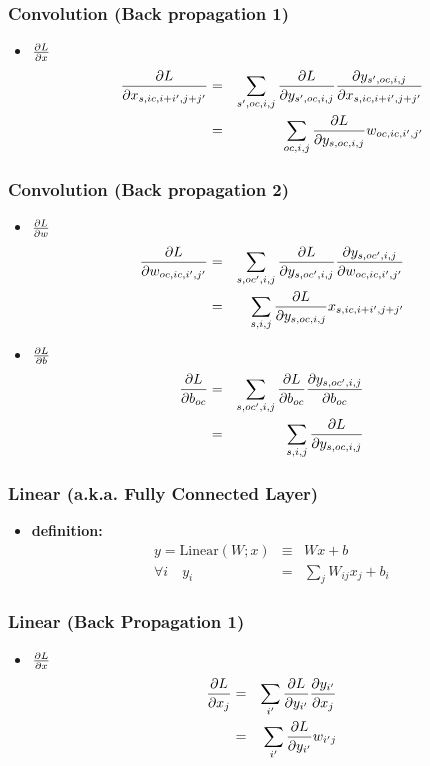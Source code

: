 \documentclass[12pt,dvipdfmx]{beamer}
\newcommand{\ao}[1]{{\color{blue}#1}}
\begin{document}
\begin{frame}
  \frametitle{Convolution (Back propagation 1)}
  \begin{itemize}
  \item $\frac{\partial L}{\partial x}$
    \begin{eqnarray*}
      \frac{\partial L}{\partial x_{s,ic,i+i',j+j'}}
      & = & \sum_{s',oc,i,j} \frac{\partial L}{\partial y_{s',oc,i,j}} \frac{\partial y_{s',oc,i,j}}{\partial x_{s,ic,i+i',j+j'}} \\
      & = & \sum_{oc,i,j} \frac{\partial L}{\partial y_{s,oc,i,j}} w_{oc,ic,i',j'} 
    \end{eqnarray*}
  \end{itemize}
\end{frame}

\begin{frame}
  \frametitle{Convolution (Back propagation 2)}
  \begin{itemize}
  \item $\frac{\partial L}{\partial w}$
    \begin{eqnarray*}
      \frac{\partial L}{\partial w_{oc,ic,i',j'}}
      & = & \sum_{s,oc',i,j} \frac{\partial L}{\partial y_{s,oc',i,j}} \frac{\partial y_{s,oc',i,j}}{\partial w_{oc,ic,i',j'}} \\
      & = & \sum_{s,i,j} \frac{\partial L}{\partial y_{s,oc,i,j}} x_{s,ic,i+i',j+j'}
    \end{eqnarray*}

  \item $\frac{\partial L}{\partial b}$
    \begin{eqnarray*}
      \frac{\partial L}{\partial b_{oc}}
      & = & \sum_{s,oc',i,j} \frac{\partial L}{\partial b_{oc}} \frac{\partial y_{s,oc',i,j}}{\partial b_{oc}} \\
      & = & \sum_{s,i,j} \frac{\partial L}{\partial y_{s,oc,i,j}}
    \end{eqnarray*}
  \end{itemize}
\end{frame}


\begin{frame}
\frametitle{Linear (a.k.a. Fully Connected Layer)}
\begin{itemize}
\item \ao{\textbf{definition:}}
\begin{eqnarray*}
  y = \mbox{Linear}(W; x) & \equiv & Wx + b \\
  \forall i \quad y_i & = & \sum_{j} W_{ij}x_j + b_i
\end{eqnarray*}
\end{itemize}
\end{frame}


\begin{frame}
\frametitle{Linear (Back Propagation 1)}
\begin{itemize}
\item $\frac{\partial L}{\partial x}$
    \begin{eqnarray*}
      \frac{\partial L}{\partial x_j} 
      & = & \sum_{i'} \frac{\partial L}{\partial y_{i'}} \frac{\partial y_{i'}}{\partial x_j} \\
      & = & \sum_{i'} \frac{\partial L}{\partial y_{i'}} w_{i'j} \\
    \end{eqnarray*}
  \end{itemize}
\end{frame}
\end{document}
